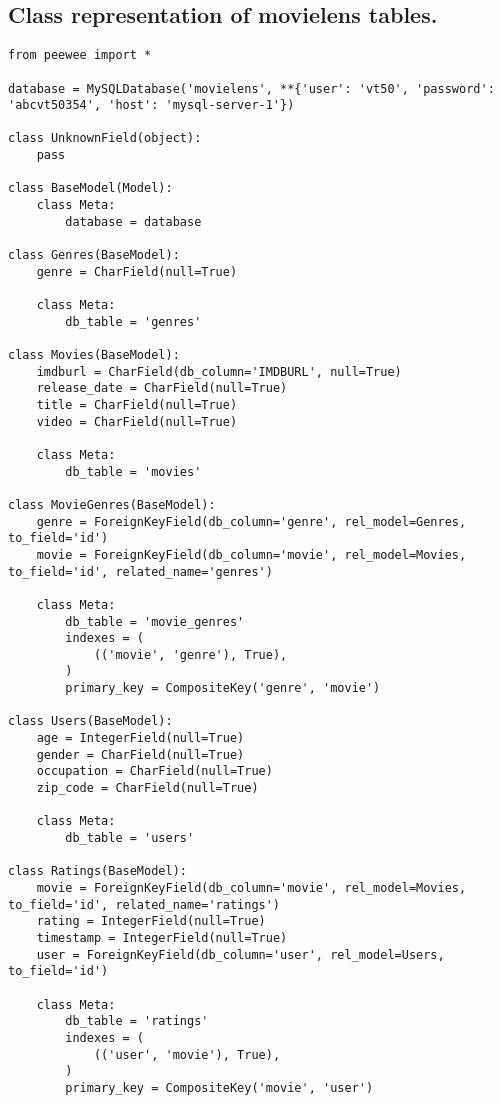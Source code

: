 \documentclass[a4paper, titlepage, 11pt]{article}
\begin{document}
\begin{appendices}
\section*{Class representation of movielens tables.}
\begin{singlespace}
\label{fig:py1}\begin{lstlisting}
from peewee import *

database = MySQLDatabase('movielens', **{'user': 'vt50', 'password': 'abcvt50354', 'host': 'mysql-server-1'})

class UnknownField(object):
    pass

class BaseModel(Model):
    class Meta:
        database = database

class Genres(BaseModel):
    genre = CharField(null=True)

    class Meta:
        db_table = 'genres'

class Movies(BaseModel):
    imdburl = CharField(db_column='IMDBURL', null=True)
    release_date = CharField(null=True)
    title = CharField(null=True)
    video = CharField(null=True)

    class Meta:
        db_table = 'movies'

class MovieGenres(BaseModel):
    genre = ForeignKeyField(db_column='genre', rel_model=Genres, to_field='id')
    movie = ForeignKeyField(db_column='movie', rel_model=Movies, to_field='id', related_name='genres')

    class Meta:
        db_table = 'movie_genres'
        indexes = (
            (('movie', 'genre'), True),
        )
        primary_key = CompositeKey('genre', 'movie')

class Users(BaseModel):
    age = IntegerField(null=True)
    gender = CharField(null=True)
    occupation = CharField(null=True)
    zip_code = CharField(null=True)

    class Meta:
        db_table = 'users'

class Ratings(BaseModel):
    movie = ForeignKeyField(db_column='movie', rel_model=Movies, to_field='id', related_name='ratings')
    rating = IntegerField(null=True)
    timestamp = IntegerField(null=True)
    user = ForeignKeyField(db_column='user', rel_model=Users, to_field='id')

    class Meta:
        db_table = 'ratings'
        indexes = (
            (('user', 'movie'), True),
        )
        primary_key = CompositeKey('movie', 'user')



\end{lstlisting}
\end{singlespace}
\end{appendices}
\end{document}
